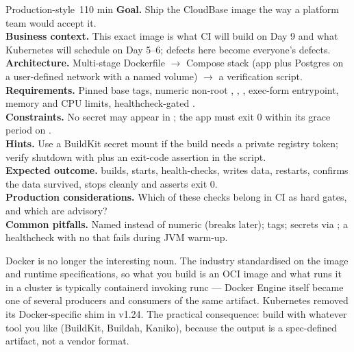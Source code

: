 \begin{minilab}{Production-style}{~110 min}
\textbf{Goal.} Ship the CloudBase image the way a platform team would accept it.\\
\textbf{Business context.} This exact image is what CI will build on Day 9 and what Kubernetes will schedule on Day 5--6; defects here become everyone's defects.\\
\textbf{Architecture.} Multi-stage Dockerfile $\rightarrow$ Compose stack (app plus Postgres on a user-defined network with a named volume) $\rightarrow$ a verification script.\\
\textbf{Requirements.} Pinned base tags, numeric non-root , , , exec-form entrypoint, memory and CPU limits, healthcheck-gated .\\
\textbf{Constraints.} No secret may appear in ; the app must exit 0 within its grace period on .\\
\textbf{Hints.} Use a BuildKit secret mount if the build needs a private registry token; verify shutdown with  plus an exit-code assertion in the script.\\
\textbf{Expected outcome.}  builds, starts, health-checks, writes data, restarts, confirms the data survived, stops cleanly and asserts exit 0.\\
\textbf{Production considerations.} Which of these checks belong in CI as hard gates, and which are advisory?\\
\textbf{Common pitfalls.} Named  instead of numeric (breaks  later);  tags; secrets via ; a healthcheck with no  that fails during JVM warm-up.
\end{minilab}


\begin{infranote}
Docker is no longer the interesting noun. The industry standardised on the  image and runtime specifications, so what you build is an OCI image and what runs it in a cluster is typically containerd invoking runc --- Docker Engine itself became one of several producers and consumers of the same artifact. Kubernetes removed its Docker-specific shim in v1.24. The practical consequence: build with whatever tool you like (BuildKit, Buildah, Kaniko), because the output is a spec-defined artifact, not a vendor format.
\end{infranote}


